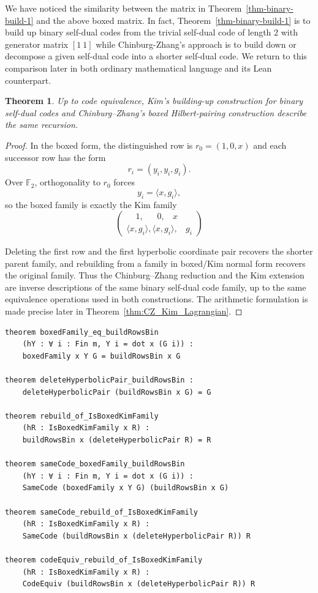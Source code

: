 \documentclass[12pt]{article}
\newtheorem{theorem}{Theorem}[section]
\newenvironment{blueblock}{\begingroup\color{blue}}{\endgroup}
\begin{document}
We have noticed the similarity between the matrix in Theorem~\ref{thm-binary-build-1} and the above boxed matrix. In fact, Theorem~\ref{thm-binary-build-1} is to build up binary self-dual codes from the trivial self-dual code of length 2 with generator matrix $[1~ 1]$ while Chinburg-Zhang's approach is to build down or decompose a given self-dual code into a shorter self-dual code.
We return to this comparison later in both ordinary mathematical language and its Lean counterpart.

\begin{theorem}\label{thm:binary-cz-kim}
Up to code equivalence, Kim's building-up construction for binary self-dual codes and Chinburg--Zhang's boxed Hilbert-pairing construction describe the same recursion.
\end{theorem}

\begin{proof}
In the boxed form, the distinguished row is $r_0=(1,0,x)$ and each successor row has the form
\[
r_i=(y_i,y_i,g_i).
\]
Over $\mathbb F_2$, orthogonality to $r_0$ forces
\[
y_i=\langle x,g_i\rangle,
\]
so the boxed family is exactly the Kim family
\[
\begin{pmatrix}
~~~~~1, ~~~~~~~ 0, ~~~~ x  \\
\langle x,g_i\rangle,\langle x,g_i\rangle, ~~~~g_i
\end{pmatrix}
\]

Deleting the first row and the first hyperbolic coordinate pair recovers the shorter parent family, and rebuilding from a family in boxed/Kim normal form recovers the original family. Thus the Chinburg--Zhang reduction and the Kim extension are inverse descriptions of the same binary self-dual code family, up to the same equivalence operations used in both constructions. The arithmetic formulation is made precise later in Theorem~\ref{thm:CZ_Kim_Lagrangian}.
\end{proof}

\begin{lstlisting}[caption={Lean bundle for Theorem~\ref{thm:binary-cz-kim}.}]
theorem boxedFamily_eq_buildRowsBin
    (hY : ∀ i : Fin m, Y i = dot x (G i)) :
    boxedFamily x Y G = buildRowsBin x G

theorem deleteHyperbolicPair_buildRowsBin :
    deleteHyperbolicPair (buildRowsBin x G) = G

theorem rebuild_of_IsBoxedKimFamily
    (hR : IsBoxedKimFamily x R) :
    buildRowsBin x (deleteHyperbolicPair R) = R

theorem sameCode_boxedFamily_buildRowsBin
    (hY : ∀ i : Fin m, Y i = dot x (G i)) :
    SameCode (boxedFamily x Y G) (buildRowsBin x G)

theorem sameCode_rebuild_of_IsBoxedKimFamily
    (hR : IsBoxedKimFamily x R) :
    SameCode (buildRowsBin x (deleteHyperbolicPair R)) R

theorem codeEquiv_rebuild_of_IsBoxedKimFamily
    (hR : IsBoxedKimFamily x R) :
    CodeEquiv (buildRowsBin x (deleteHyperbolicPair R)) R
\end{lstlisting}
\end{document}
